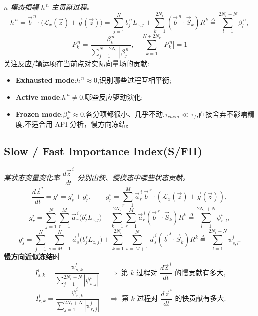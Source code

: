 \documentclass[11pt,a4paper]{article}
\newcommand{\diff}[2]{\dfrac{d #1}{d #2}}
\begin{document}
\emph{$n$ 模态振幅 $h^{\,n}$ 主贡献过程。}
\begin{equation}
h^{\,n}=\vec b^{\,n}\cdot \bigl(\mathcal L_x(\vec z)+\vec g(\vec z)\bigr)
=\sum_{j=1}^{N}b^{\,n}_{j}L_{z,j}+\sum_{k=1}^{2N_r}(\vec b^{\,n}\cdot\vec S_k)R^{k}
\overset{\Delta}{=}\sum_{l=1}^{2N_r+N}\beta^{\,n}_{l},
\end{equation}
\begin{equation}
\boxed{\;P^{\,n}_{k}=\frac{\beta^{\,n}_{k}}{\sum_{j=1}^{N+2N_r}|\beta^{\,n}_{j}|},\quad
\sum_{k=1}^{N+2N_r}|P^{\,n}_{k}|=1\;}
\end{equation}
关注反应/输运项在当前点对实际向量场的贡献:
\begin{itemize}[leftmargin=2em]
\item \textbf{Exhausted mode}:$h^{\,n}\approx 0$,识别哪些过程互相平衡;
\item \textbf{Active mode}:$h^{\,n}\neq 0$,哪些反应驱动演化;
\item \textbf{Frozen mode}:$\beta^{\,n}_{k}\approx 0$,各分项都很小、几乎不动,$\tau_{chem}\ll\tau_f$,直接舍弃不影响精度,不适合用 API 分析，慢方向冻结。
\end{itemize}

\subsection{Slow / Fast Importance Index(S/FII)}

\emph{某状态变量变化率 $\diff{\vec z^{\,i}}{t}$ 分别由快、慢模态中哪些状态贡献。}
\begin{equation}
\diff{\vec z^{\,i}}{t}=g^{i}=g^{i}_{s}+g^{i}_{r},\qquad
g^{i}_{r}=\sum_{r=1}^{M}\vec a_r^{\,i}\,\vec b^{\,r}\cdot(\mathcal L_x(\vec z)+\vec g(\vec z)),
\end{equation}
\[
g^{i}_{r}=\sum_{j=1}^{N}\sum_{r=1}^{M}\vec a_r^{\,i}\bigl(b^{r}_{j}L_{z,j}\bigr)
+\sum_{k=1}^{2N_r}\sum_{r=1}^{M}\vec a_r^{\,i}(\vec b^{\,r}\cdot\vec S_k)R^{k}
\overset{\Delta}{=}\sum_{l=1}^{2N_r+N}\psi^{i}_{r,l},
\]
\[
g^{i}_{s}=\sum_{j=1}^{N}\sum_{s=M+1}^{N}\vec a_s^{\,i}\bigl(b^{s}_{j}L_{z,j}\bigr)
+\sum_{k=1}^{2N_r}\sum_{s=M+1}^{N}\vec a_s^{\,i}(\vec b^{\,s}\cdot\vec S_k)R^{k}
\overset{\Delta}{=}\sum_{l=1}^{2N_r+N}\psi^{i}_{s,l}.
\]
\textbf{慢方向近似冻结}时
\begin{equation}
\boxed{\;I^{i}_{s,k}=\frac{\psi^{i}_{s,k}}{\sum_{j=1}^{2N_r+N}|\psi^{i}_{s,j}|}\;}\quad\Rightarrow\;
\text{第 }k\text{ 过程对 }\diff{\vec z^{\,i}}{t}\text{ 的慢贡献有多大},
\end{equation}
\begin{equation}
\boxed{\;I^{i}_{r,k}=\frac{\psi^{i}_{r,k}}{\sum_{j=1}^{2N_r+N}|\psi^{i}_{r,j}|}\;}\quad\Rightarrow\;
\text{第 }k\text{ 过程对 }\diff{\vec z^{\,i}}{t}\text{ 的快贡献有多大}.
\end{equation}
\end{document}
